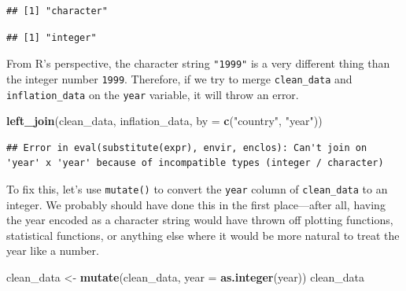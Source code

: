 \documentclass[12pt,oneside,openany]{tufte-book}
\newenvironment{Shaded}{}{}
\newcommand{\KeywordTok}[1]{\textcolor[rgb]{0.00,0.44,0.13}{\textbf{{#1}}}}
\newcommand{\DataTypeTok}[1]{\textcolor[rgb]{0.56,0.13,0.00}{{#1}}}
\newcommand{\StringTok}[1]{\textcolor[rgb]{0.25,0.44,0.63}{{#1}}}
\newcommand{\NormalTok}[1]{{#1}}
\begin{document}
\begin{Shaded}
\end{Shaded}

\begin{verbatim}
## [1] "character"
\end{verbatim}

\begin{Shaded}
\end{Shaded}

\begin{verbatim}
## [1] "integer"
\end{verbatim}

From R's perspective, the character string \texttt{"1999"} is a very
different thing than the integer number \texttt{1999}. Therefore, if we
try to merge \texttt{clean\_data} and \texttt{inflation\_data} on the
\texttt{year} variable, it will throw an error.

\begin{Shaded}
\begin{Highlighting}[]
\KeywordTok{left_join}\NormalTok{(clean_data, inflation_data, }\DataTypeTok{by =} \KeywordTok{c}\NormalTok{(}\StringTok{"country"}\NormalTok{, }
    \StringTok{"year"}\NormalTok{))}
\end{Highlighting}
\end{Shaded}

\begin{verbatim}
## Error in eval(substitute(expr), envir, enclos): Can't join on 'year' x 'year' because of incompatible types (integer / character)
\end{verbatim}

To fix this, let's use \texttt{mutate()} to convert the \texttt{year}
column of \texttt{clean\_data} to an integer. We probably should have
done this in the first place---after all, having the year encoded as a
character string would have thrown off plotting functions, statistical
functions, or anything else where it would be more natural to treat the
year like a number.

\begin{Shaded}
\begin{Highlighting}[]
\NormalTok{clean_data <-}\StringTok{ }\KeywordTok{mutate}\NormalTok{(clean_data, }\DataTypeTok{year =} \KeywordTok{as.integer}\NormalTok{(year))}
\NormalTok{clean_data}
\end{Highlighting}
\end{Shaded}
\end{document}

